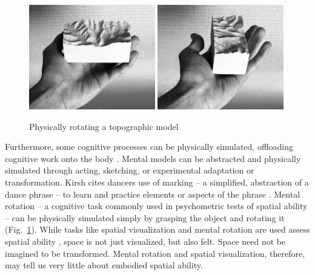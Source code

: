 \documentclass[prodmode,acmtochi]{acmsmall} %
\begin{document}
\begin{figure}[h!]
\begin{center}
		\includegraphics[width=0.49\textwidth]{images/physical_rotation_1.jpg}
		\includegraphics[width=0.49\textwidth]{images/physical_rotation_2.jpg}
	\caption{Physically rotating a topographic model}
	\label{fig:physical_rotation}
\end{center}
\end{figure}

Furthermore, some cognitive processes can be physically simulated, offloading cognitive work onto the body \cite{Kirsh2013}. 
%
Mental models can be abstracted and physically simulated 
through acting, 
sketching, 
or experimental adaptation or transformation. 
%
Kirsh cites dancers use of marking 
-- a simplified, abstraction of a dance phrase -- 
to learn and practice elements or aspects of the phrase \cite{Kirsh2013}. 
%
Mental rotation 
-- a cognitive task commonly used in psychometric tests of spatial ability -- 
can be physically simulated 
simply by grasping the object and rotating it (Fig.~\ref{fig:physical_rotation}).
%
While tasks like spatial visualization and mental rotation are used assess spatial ability
\cite{Uttal2013a,Uttal2013,Ormand2014}, 
space is not just visualized, but also felt.
Space need not be imagined to be transformed. 
Mental rotation and spatial visualization, therefore, 
may tell us very little about embodied spatial ability. 
\end{document}
